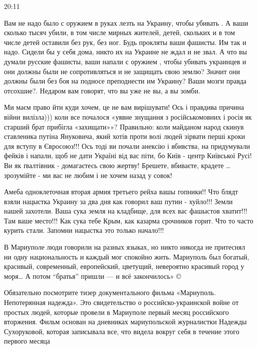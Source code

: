 {%
20:11

Вам не надо было с оружием в руках лезть на Украину, чтобы убивать . А ваши
сколько тысяч убили, в том числе мирных жителей, детей, скольких и в том числе
детей оставили без рук, без ног. Будь прокляты ваши фашисты. Им так и надо.
Сидели бы у себя дома, никто их на Украине не ждал и не звал. А что вы думали
русские фашисты, ваши напали с оружием , чтобы убивать украинцев и они должны
были не сопротивляться и не защищать свою землю? Значит они должны были без боя
на подносе преподнести им Украину? Ваши мозги правда отсохшие?. Недаром вам
говорят, что вы уже не вы, а вы зомби.


Ми маєм право йти куди хочем, це не вам вирішувати! Ось і правдива причина
війни вилізла))) коли все почалося «уявне знущання з російськомовних і росія як
старший брат прибігла «захищати»»? Правильно: коли майданом народ скинув
ставленика путіна Януковича, який хотів проти волі людей зірвати перші кроки
для вступу в Євросоюз!!! Ось тоді ви почали анексію і вбивства, на придумували
фейків і напали, щоб не дати Україні від вас піти, бо Київ - центр Київської
Русі! Ви як ґвалтівник - домагаєтесь свою жертву! Брешете, вбиваєте, крадете …
зрозумійте - ми вас не любим і не хочем назад у совок!


Амеба одноклеточная вторая армия третьего рейха вашы гопники!! Что блядт взяли
нацыстка Украину за два дня как говорил ваш путин - хуйло!!! Земли нашей
захотели. Ваша сука земля на кладбище, для всех вас фашыстов хватит!!! Там ваше
место!!! Как сука тебе Крым, как казарма срочников горит. Что то часто курить
стали. Запомни нацыстка это только начало!!!


В Мариуполе люди говорили на разных языках, но никто никогда не притеснял ни
одну национальность и каждый мог спокойно жить. Мариуполь был богатый,
красивый, современный, европейский, цветущий, невероятно красивый город у моря…
А потом “братья” пришли — и всё закончилось» ©

Обязательно посмотрите тизер документального фильма «Мариуполь. Непотерянная
надежда». Это свидетельство о российско-украинской войне от простых людей,
которые провели в Мариуполе первый месяц российского вторжения. Фильм основан
на дневниках мариупольской журналистки Надежды Сухоруковой, которая записывала
все, что видела вокруг себя в течение этого первого месяца

}
